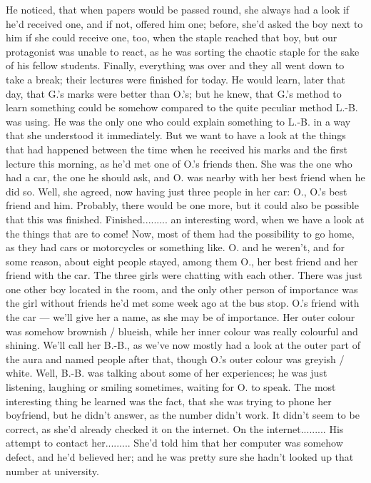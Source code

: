 He noticed, that when papers would be passed round, she always had a look if he'd received one, and if not, offered him one; before, she'd asked the boy next to him if she could receive one, too, when the staple reached that boy, but our protagonist was unable to react, as he was sorting the chaotic staple for the sake of his fellow students. 
Finally, everything was over and they all went down to take a break; their lectures were finished for today. 
He would learn, later that day, that G.'s marks were better than O.'s; but he knew, that G.'s method to learn something could be somehow compared to the quite peculiar method L.-B. was using. He was the only one who could explain something to L.-B. in a way that she understood it immediately. 
But we want to have a look at the things that had happened between the time when he received his marks and the first lecture this morning, as he'd met one of O.'s friends then. 
She was the one who had a car, the one he should ask, and O. was nearby with her best friend when he did so. Well, she agreed, now having just three people in her car: O., O.'s best friend and him. Probably, there would be one more, but it could also be possible that this was finished. 
Finished.........
an interesting word, when we have a look at the things that are to come!
Now, most of them had the possibility to go home, as they had cars or motorcycles or something like. 
O. and he weren't, and for some reason, about eight people stayed, among them O., her best friend and her friend with the car. 
The three girls were chatting with each other. There was just one other boy located in the room, and the only other person of importance was the girl without friends he'd met some week ago at the bus stop. 
O.'s friend with the car --- we'll give her a name, as she may be of importance. Her outer colour was somehow brownish / blueish, while her inner colour was really colourful and shining. 
We'll call her B.-B., as we've now mostly had a look at the outer part of the aura and named people after that, though O.'s outer colour was greyish / white. 
Well, B.-B. was talking about some of her experiences; he was just listening, laughing or smiling sometimes, waiting for O. to speak. 
The most interesting thing he learned was the fact, that she was trying to phone her boyfriend, but he didn't answer, as the number didn't work. It didn't seem to be correct, as she'd already checked it on the internet. 
On the internet.........
His attempt to contact her.........
She'd told him that her computer was somehow defect, and he'd believed her; and he was pretty sure she hadn't looked up that number at university. 
